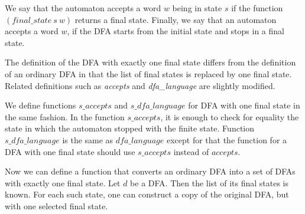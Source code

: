 We say that the automaton accepts a word $w$ being in state $s$ if the function $(\textit{final\_state} \ s \ w)$ returns a final state.
Finally, we say that an automaton accepts a word $w$, if the DFA starts from the initial state and stops in a final state.


The definition of the  DFA with exactly one final state differs from the definition of an ordinary DFA in that the list of final states is replaced by one final state.
Related definitions such as \textit{accepts} and \textit{dfa\_language} are slightly modified.


We define functions $\textit{s\_accepts}$ and $\textit{s\_dfa\_language}$ for DFA with one final state in the same fashion.
In the function $\textit{s\_accepts}$, it is enough to check for equality the state in which the automaton stopped with the finite state. Function $\textit{s\_dfa\_language}$ is the same as  $\textit{dfa\_language}$ except for that the function for a DFA with one final state should use $\textit{s\_accepts}$ instead of $\textit{accepts}$.

Now we can define a function that converts an ordinary DFA into a set of DFAs with exactly one final state.
Let $d$ be a DFA. Then the list of its final states is known.
For each such state, one can construct a copy of the original DFA, but with one selected final state.





